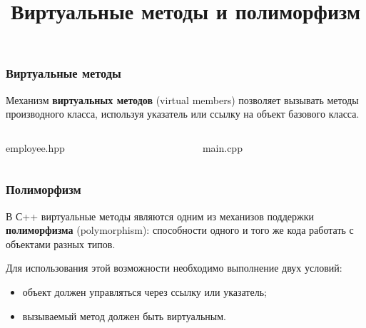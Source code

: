 \documentclass[compress, 8pt]{beamer}
\title{Виртуальные методы и полиморфизм}
\begin{document}
\frame[plain]{\titlepage}

\begin{frame}[fragile]

    \frametitle{Виртуальные методы}

    \hfill\break
    Механизм \textbf{виртуальных методов} (virtual members) позволяет вызывать
    методы производного класса, используя указатель или ссылку на объект
    базового класса.

    \begin{columns}

        \begin{column}{0.5\textwidth}

                {employee.hpp}

        \end{column}

        \begin{column}{0.5\textwidth}

                {main.cpp}

        \end{column}

    \end{columns}

\end{frame}

\begin{frame}[fragile]

    \frametitle{Полиморфизм}

    В С++ виртуальные методы являются одним из механизов поддержки
    \textbf{полиморфизма} (polymorphism): способности одного и того же
    кода работать с объектами разных типов.

    \hfill\break
    Для использования этой возможности необходимо выполнение двух условий:

    \begin{itemize}
        \item объект должен управляться через ссылку или указатель;
        \item вызываемый метод должен быть виртуальным.
    \end{itemize}

\end{frame}
\end{document}
